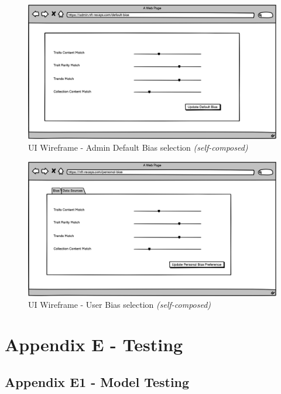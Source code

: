 \begin{figure}[h!]
\centering
\includegraphics[width=\textwidth]{images/appendix/UI Wireframes/Admin Default Bias selection.png}
\caption{UI Wireframe - Admin Default Bias selection \textit{(self-composed)}}
\end{figure}

\begin{figure}[h!]
\centering
\includegraphics[width=\textwidth]{images/appendix/UI Wireframes/User Bias selection.png}
\caption{UI Wireframe - User Bias selection \textit{(self-composed)}}
\end{figure}


\chapter{Appendix E - Testing}
\label{appendix:testing}

\section*{Appendix E1 - Model Testing}

